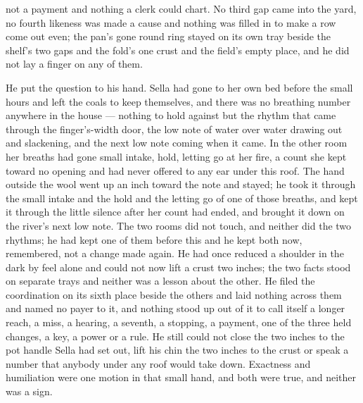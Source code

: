 not a payment and nothing a clerk could chart. No third gap came into the yard, no fourth likeness was made a cause and nothing was filled in to make a row come out even; the pan's gone round ring stayed on its own tray beside the shelf's two gaps and the fold's one crust and the field's empty place, and he did not lay a finger on any of them.

He put the question to his hand. Sella had gone to her own bed before the small hours and left the coals to keep themselves, and there was no breathing number anywhere in the house --- nothing to hold against but the rhythm that came through the finger's-width door, the low note of water over water drawing out and slackening, and the next low note coming when it came. In the other room her breaths had gone small intake, hold, letting go at her fire, a count she kept toward no opening and had never offered to any ear under this roof. The hand outside the wool went up an inch toward the note and stayed; he took it through the small intake and the hold and the letting go of one of those breaths, and kept it through the little silence after her count had ended, and brought it down on the river's next low note. The two rooms did not touch, and neither did the two rhythms; he had kept one of them before this and he kept both now, remembered, not a change made again. He had once reduced a shoulder in the dark by feel alone and could not now lift a crust two inches; the two facts stood on separate trays and neither was a lesson about the other. He filed the coordination on its sixth place beside the others and laid nothing across them and named no payer to it, and nothing stood up out of it to call itself a longer reach, a miss, a hearing, a seventh, a stopping, a payment, one of the three held changes, a key, a power or a rule. He still could not close the two inches to the pot handle Sella had set out, lift his chin the two inches to the crust or speak a number that anybody under any roof would take down. Exactness and humiliation were one motion in that small hand, and both were true, and neither was a sign.

